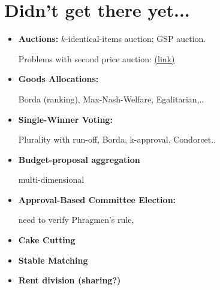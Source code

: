     



\ifdefined\DRAFT
\section{Didn't get there yet...} 
\begin{itemize}
    \item 
    \textbf{Auctions:} 
    $k$-identical-items auction;
    GSP auction.

    Problems with second price auction: \href{https://citeseerx.ist.psu.edu/document?repid=rep1&type=pdf&doi=4d92838c1357e132987d82ad3c6a426141a7f8cd}{(link)}

    \item \textbf{Goods Allocations:} 
    
    Borda (ranking), Max-Nash-Welfare, Egalitarian,..

    \item \textbf{Single-Winner Voting:} 
    
    Plurality with run-off, Borda, k-approval, Condorcet..

    \item \textbf{Budget-proposal aggregation}

    multi-dimensional

    \item \textbf{Approval-Based Committee Election:} 
    
    need to verify Phragmen’s rule,
    
    \item \textbf{Cake Cutting}

    \item \textbf{Stable Matching}
    
    \item \textbf{Rent division (sharing?)}
\end{itemize}
\fi


